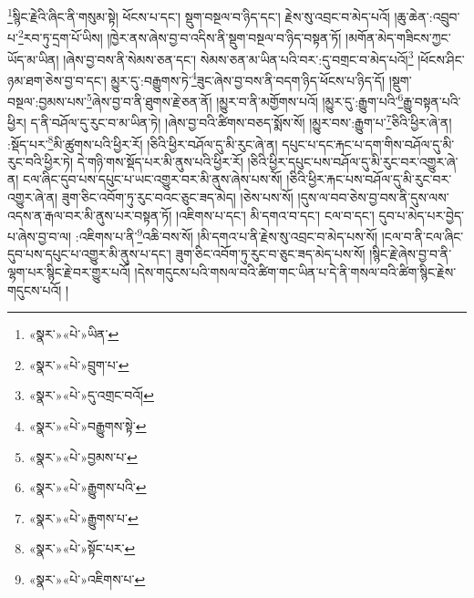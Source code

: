 \footnote{«སྣར་»«པེ་»ཡིན་}སྙིང་རྗེའི་ཞིང་ནི་གསུམ་སྟེ། ཕོངས་པ་དང་། སྡུག་བསྔལ་བ་ཉིད་དང་། རྗེས་སུ་འབྲང་བ་མེད་པའོ། །ཆུ་ཆེན་:འབྲུབ་པ་\footnote{«སྣར་»«པེ་»བྲུག་པ་}རབ་ཏུ་དྲག་པོ་ཡིས། །ཁྱེར་ནས་ཞེས་བྱ་བ་འདིས་ནི་སྡུག་བསྔལ་བ་ཉིད་བསྟན་ཏོ། །མགོན་མེད་གཟིངས་ཀྱང་ཡོད་མ་ཡིན། །ཞེས་བྱ་བས་ནི་སེམས་ཅན་དང་། སེམས་ཅན་མ་ཡིན་པའི་བར་:དུ་བགྲང་བ་མེད་པའོ།\footnote{«སྣར་»«པེ་»དུ་འགྲང་བའོ།} །ཕོངས་ཤིང་ཉམ་ཐག་ཅེས་བྱ་བ་དང་། མྱུར་དུ་:བརྒྱུགས་ཏེ་\footnote{«སྣར་»«པེ་»བརྒྱུགས་སྟེ་}ཟུང་ཞེས་བྱ་བས་ནི་བདག་ཉིད་ཕོངས་པ་ཉིད་དོ། །སྡུག་བསྔལ་:བྱམས་པས་\footnote{«སྣར་»«པེ་»བྱམས་པ་}ཞེས་བྱ་བ་ནི་ཐུགས་རྗེ་ཅན་ནོ། །མྱུར་བ་ནི་མགྱོགས་པའོ། །མྱུར་དུ་:རྒྱུག་པའི་\footnote{«སྣར་»«པེ་»རྒྱུགས་པའི་}རྒྱུ་བསྟན་པའི་ཕྱིར། ད་ནི་བཤོལ་དུ་རུང་བ་མ་ཡིན་ཏེ། །ཞེས་བྱ་བའི་ཚིགས་བཅད་སྨོས་སོ། །མྱུར་བས་:རྒྱུག་པ་\footnote{«སྣར་»«པེ་»རྒྱུགས་པ་}ཅིའི་ཕྱིར་ཞེ་ན། :སྡོད་པར་\footnote{«སྣར་»«པེ་»སྟོང་པར་}མི་ཚུགས་པའི་ཕྱིར་རོ། །ཅིའི་ཕྱིར་བཤོལ་དུ་མི་རུང་ཞེ་ན། དཔུང་པ་དང་རྐང་པ་དག་གིས་བཤོལ་དུ་མི་རུང་བའི་ཕྱིར་ཏེ། དེ་གཉི་གས་སྡོད་པར་མི་ནུས་པའི་ཕྱིར་རོ། །ཅིའི་ཕྱིར་དཔུང་པས་བཤོལ་དུ་མི་རུང་བར་འགྱུར་ཞེ་ན། ངལ་ཞིང་དུབ་པས་དཔུང་པ་ཡང་འགྱུར་བར་མི་ནུས་ཞེས་པས་སོ། །ཅིའི་ཕྱིར་རྐང་པས་བཤོལ་དུ་མི་རུང་བར་འགྱུར་ཞེ་ན། ཟུག་ཅིང་འབོག་ཏུ་རུང་བའང་ཅུང་ཟད་མེད། །ཅེས་པས་སོ། །དུས་ལ་བབ་ཅེས་བྱ་བས་ནི་དུས་ལས་འདས་ན་རྒལ་བར་མི་ནུས་པར་བསྟན་ཏོ། །འཇིགས་པ་དང་། མི་དགའ་བ་དང་། ངལ་བ་དང་། དུབ་པ་མེད་པར་བྱེད་པ་ཞེས་བྱ་བ་ལ། :འཇིགས་པ་ནི་\footnote{«སྣར་»«པེ་»འཇིགས་པ་}འཆི་བས་སོ། །མི་དགའ་པ་ནི་རྗེས་སུ་འབྲང་བ་མེད་པས་སོ། །ངལ་བ་ནི་ངལ་ཞིང་དུབ་པས་དཔུང་པ་འགྱུར་མི་ནུས་པ་དང་། ཟུག་ཅིང་འབོག་ཏུ་རུང་བ་ཅུང་ཟད་མེད་པས་སོ། །སྙིང་རྗེ་ཞེས་བྱ་བ་ནི་ལྷག་པར་སྙིང་རྗེ་བར་གྱུར་པའོ། །དེས་གདུངས་པའི་གསལ་བའི་ཚིག་གང་ཡིན་པ་དེ་ནི་གསལ་བའི་ཚིག་སྙིང་རྗེས་གདུངས་པའོ། །
